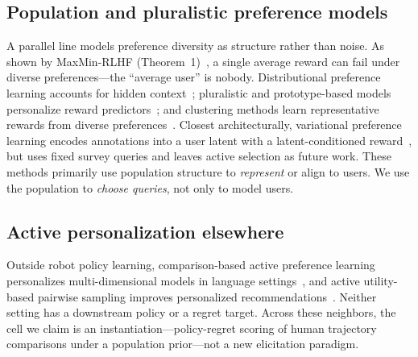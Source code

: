 \subsection{Population and pluralistic preference models}
A parallel line models preference diversity as structure rather than noise.
As shown by MaxMin-RLHF (Theorem~1)~\citep{chakraborty2024maxmin}, a single
average reward can fail under diverse preferences---the ``average user'' is
nobody.
Distributional preference learning accounts for hidden
context~\citep{siththaranjan2024dpl}; pluralistic and prototype-based models
personalize reward predictors~\citep{chen2025pal}; and clustering methods learn
representative rewards from diverse preferences~\citep{kim2026prec}.
Closest architecturally, variational preference learning encodes annotations
into a user latent with a latent-conditioned reward~\citep{poddar2024vpl}, but
uses fixed survey queries and leaves active selection as future work.
These methods primarily use population structure to \emph{represent} or align to
users.
We use the population to \emph{choose queries}, not only to model users.

\subsection{Active personalization elsewhere}
Outside robot policy learning, comparison-based active preference learning
personalizes multi-dimensional models in language settings~\citep{oh2025ample},
and active utility-based pairwise sampling improves personalized
recommendations~\citep{boroomand2025utility}.
Neither setting has a downstream policy or a regret target.
Across these neighbors, the cell we claim is an instantiation---policy-regret
scoring of human trajectory comparisons under a population prior---not a new
elicitation paradigm.
